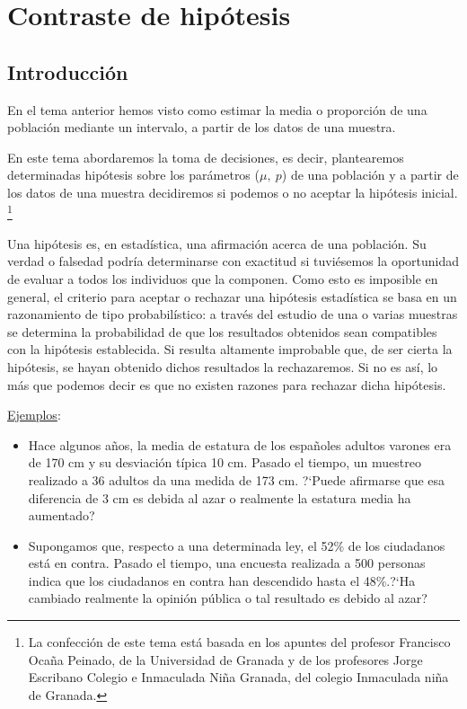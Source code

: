 \chapter{Contraste de hipótesis}



\section{Introducción}
En el tema anterior hemos visto como estimar la media o proporción de una población mediante un intervalo,  a partir de los datos de una muestra.


En este tema abordaremos la toma de decisiones, es decir, plantearemos determinadas hipótesis sobre los parámetros ($\mu,\ p$) de una población y a partir de los datos de una muestra decidiremos si podemos o no aceptar la hipótesis inicial. \footnote{La confección de este tema está basada en los apuntes del profesor Francisco Ocaña Peinado, de la Universidad de Granada y de los profesores Jorge Escribano Colegio e Inmaculada Niña Granada, del colegio Inmaculada niña de Granada.}
	
Una hipótesis es, en estadística,  una afirmación acerca de una  población. Su verdad o falsedad podría determinarse con exactitud si tuviésemos la oportunidad de evaluar a todos los individuos que la componen. Como esto es imposible en general, el criterio para aceptar o rechazar una hipótesis estadística se basa en un razonamiento de tipo probabilístico: a través del estudio de una o varias muestras se determina la probabilidad de que los resultados obtenidos sean compatibles con la hipótesis establecida. Si resulta altamente improbable que, de ser cierta la hipótesis, se hayan obtenido dichos resultados la rechazaremos. Si no es así, lo más que podemos decir es que no existen razones para rechazar dicha hipótesis. 


\vspace{4mm} \underline{Ejemplos}: 

	\begin{itemize}
	\item Hace algunos años, la media de estatura de los españoles adultos varones era de 170 cm y su desviación típica 10 cm. Pasado el tiempo, un muestreo realizado a 36 adultos da una medida de 173 cm. ?`Puede afirmarse que esa diferencia de 3 cm es debida al azar o realmente la estatura media ha aumentado?

	\item Supongamos que, respecto a una determinada ley, el 52\% de los ciudadanos está en contra. Pasado el tiempo, una encuesta realizada a 500 personas indica que los ciudadanos en contra han descendido hasta el 48\%.?`Ha cambiado realmente la opinión pública o tal resultado es debido al azar?
	\end{itemize}

